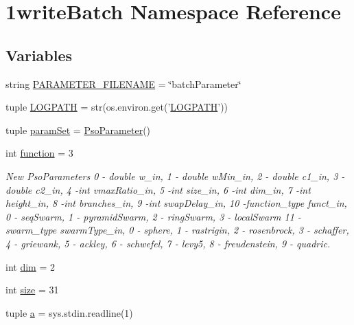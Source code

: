 \hypertarget{namespace1writeBatch}{
\section{1writeBatch Namespace Reference}
\label{namespace1writeBatch}
}


\subsection*{Variables}
\begin{CompactItemize}
\item 
string \hyperlink{namespace1writeBatch_f67acb0a0795d91f6b2129a95004f4c7}{PARAMETER\_\-FILENAME} = \char`\"{}batchParameter\char`\"{}
\item 
tuple \hyperlink{namespace1writeBatch_881ecbadb139f162fdc515a7e137af1c}{LOGPATH} = str(os.environ.get('\hyperlink{namespace1writeBatch_881ecbadb139f162fdc515a7e137af1c}{LOGPATH}'))
\item 
tuple \hyperlink{namespace1writeBatch_ccdaad4397f12c1fe9e5a9d2e090ee2d}{paramSet} = \hyperlink{classpsoParameter_1_1PsoParameter}{PsoParameter}()
\item 
int \hyperlink{namespace1writeBatch_a7ecce065fb47d41cb2018e9a1295783}{function} = 3
\begin{CompactList}\small\item\em New PsoParameters 0 - double w\_\-in, 1 - double wMin\_\-in, 2 - double c1\_\-in, 3 - double c2\_\-in, 4 -int vmaxRatio\_\-in, 5 -int size\_\-in, 6 -int dim\_\-in, 7 -int height\_\-in, 8 -int branches\_\-in, 9 -int swapDelay\_\-in, 10 -function\_\-type funct\_\-in, 0 - seqSwarm, 1 - pyramidSwarm, 2 - ringSwarm, 3 - localSwarm 11 -swarm\_\-type swarmType\_\-in, 0 - sphere, 1 - rastrigin, 2 - rosenbrock, 3 - schaffer, 4 - griewank, 5 - ackley, 6 - schwefel, 7 - levy5, 8 - freudenstein, 9 - quadric. \item\end{CompactList}\item 
int \hyperlink{namespace1writeBatch_46743721cf2ece6286597e3ccbc3f356}{dim} = 2
\item 
int \hyperlink{namespace1writeBatch_4f02cb09580bc2df74a604dcda29e4b2}{size} = 31
\item 
tuple \hyperlink{namespace1writeBatch_15e49200b8cdfb4e0d00f8a4546b2b24}{a} = sys.stdin.readline(1)

\end{CompactItemize}

